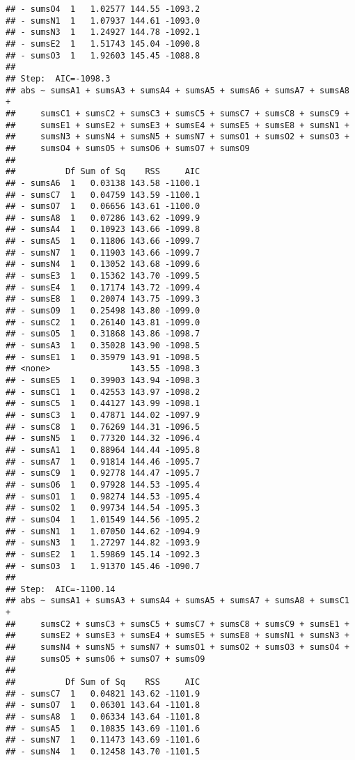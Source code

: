 \documentclass[,man,floatsintext]{apa6}
\begin{document}
\begin{verbatim}
## - sumsO4  1   1.02577 144.55 -1093.2
## - sumsN1  1   1.07937 144.61 -1093.0
## - sumsN3  1   1.24927 144.78 -1092.1
## - sumsE2  1   1.51743 145.04 -1090.8
## - sumsO3  1   1.92603 145.45 -1088.8
## 
## Step:  AIC=-1098.3
## abs ~ sumsA1 + sumsA3 + sumsA4 + sumsA5 + sumsA6 + sumsA7 + sumsA8 + 
##     sumsC1 + sumsC2 + sumsC3 + sumsC5 + sumsC7 + sumsC8 + sumsC9 + 
##     sumsE1 + sumsE2 + sumsE3 + sumsE4 + sumsE5 + sumsE8 + sumsN1 + 
##     sumsN3 + sumsN4 + sumsN5 + sumsN7 + sumsO1 + sumsO2 + sumsO3 + 
##     sumsO4 + sumsO5 + sumsO6 + sumsO7 + sumsO9
## 
##          Df Sum of Sq    RSS     AIC
## - sumsA6  1   0.03138 143.58 -1100.1
## - sumsC7  1   0.04759 143.59 -1100.1
## - sumsO7  1   0.06656 143.61 -1100.0
## - sumsA8  1   0.07286 143.62 -1099.9
## - sumsA4  1   0.10923 143.66 -1099.8
## - sumsA5  1   0.11806 143.66 -1099.7
## - sumsN7  1   0.11903 143.66 -1099.7
## - sumsN4  1   0.13052 143.68 -1099.6
## - sumsE3  1   0.15362 143.70 -1099.5
## - sumsE4  1   0.17174 143.72 -1099.4
## - sumsE8  1   0.20074 143.75 -1099.3
## - sumsO9  1   0.25498 143.80 -1099.0
## - sumsC2  1   0.26140 143.81 -1099.0
## - sumsO5  1   0.31868 143.86 -1098.7
## - sumsA3  1   0.35028 143.90 -1098.5
## - sumsE1  1   0.35979 143.91 -1098.5
## <none>                143.55 -1098.3
## - sumsE5  1   0.39903 143.94 -1098.3
## - sumsC1  1   0.42553 143.97 -1098.2
## - sumsC5  1   0.44127 143.99 -1098.1
## - sumsC3  1   0.47871 144.02 -1097.9
## - sumsC8  1   0.76269 144.31 -1096.5
## - sumsN5  1   0.77320 144.32 -1096.4
## - sumsA1  1   0.88964 144.44 -1095.8
## - sumsA7  1   0.91814 144.46 -1095.7
## - sumsC9  1   0.92778 144.47 -1095.7
## - sumsO6  1   0.97928 144.53 -1095.4
## - sumsO1  1   0.98274 144.53 -1095.4
## - sumsO2  1   0.99734 144.54 -1095.3
## - sumsO4  1   1.01549 144.56 -1095.2
## - sumsN1  1   1.07050 144.62 -1094.9
## - sumsN3  1   1.27297 144.82 -1093.9
## - sumsE2  1   1.59869 145.14 -1092.3
## - sumsO3  1   1.91370 145.46 -1090.7
## 
## Step:  AIC=-1100.14
## abs ~ sumsA1 + sumsA3 + sumsA4 + sumsA5 + sumsA7 + sumsA8 + sumsC1 + 
##     sumsC2 + sumsC3 + sumsC5 + sumsC7 + sumsC8 + sumsC9 + sumsE1 + 
##     sumsE2 + sumsE3 + sumsE4 + sumsE5 + sumsE8 + sumsN1 + sumsN3 + 
##     sumsN4 + sumsN5 + sumsN7 + sumsO1 + sumsO2 + sumsO3 + sumsO4 + 
##     sumsO5 + sumsO6 + sumsO7 + sumsO9
## 
##          Df Sum of Sq    RSS     AIC
## - sumsC7  1   0.04821 143.62 -1101.9
## - sumsO7  1   0.06301 143.64 -1101.8
## - sumsA8  1   0.06334 143.64 -1101.8
## - sumsA5  1   0.10835 143.69 -1101.6
## - sumsN7  1   0.11473 143.69 -1101.6
## - sumsN4  1   0.12458 143.70 -1101.5

\end{verbatim}
\end{document}
